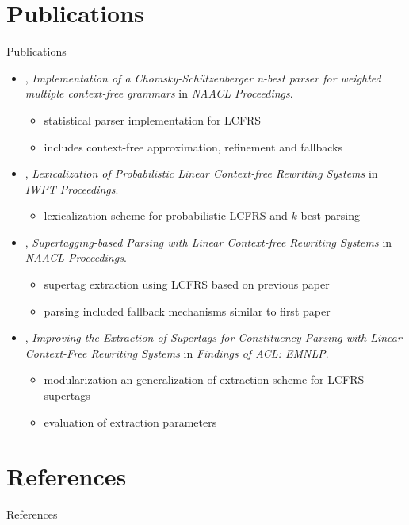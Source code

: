 \documentclass[aspectratio=169, 10pt]{beamer}
\begin{document}
    \section{Publications}
    \begin{frame}{Publications}
        \begin{itemize}
            \item \citealp*{RupDen19}, \emph{Implementation of a {C}homsky-Sch{\"u}tzenberger n-best parser for weighted multiple context-free grammars} in \emph{NAACL Proceedings}.
                \begin{itemize}
                    \item statistical parser implementation for LCFRS
                    \item includes context-free approximation, refinement and fallbacks
                \end{itemize}
            \item \citealp{MoeRup20}, \emph{Lexicalization of Probabilistic Linear Context-free Rewriting Systems} in \emph{IWPT Proceedings}.
                \begin{itemize}
                    \item lexicalization scheme for probabilistic LCFRS and $k$-best parsing
                \end{itemize}
            \item \citealp{RupMoe21}, \emph{Supertagging-based Parsing with Linear Context-free Rewriting Systems} in \emph{NAACL Proceedings}.
                \begin{itemize}
                    \item supertag extraction using LCFRS based on previous paper
                    \item parsing included fallback mechanisms similar to first paper
                \end{itemize}
            \item \citealp{Rup22}, \emph{Improving the Extraction of Supertags for Constituency Parsing with Linear Context-Free Rewriting Systems} in \emph{Findings of ACL: EMNLP}.
                \begin{itemize}
                    \item modularization an generalization of extraction scheme for LCFRS supertags
                    \item evaluation of extraction parameters
                \end{itemize}
        \end{itemize}
    \end{frame}


    \section*{References}
    \begin{frame}{References}
        \footnotesize
        
        
    \end{frame}
\end{document}
